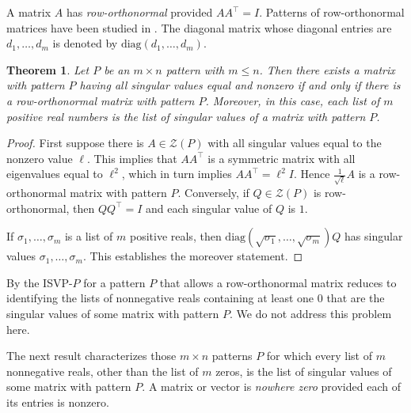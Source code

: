 \documentclass[preprint,12pt]{elsarticle}
\newcommand{\trans  }{^\top}
\newtheorem{theorem}{Theorem}[section]
\begin{document}
A matrix $A$ has {\it row-orthonormal} provided 
$AA\trans=I$. 
Patterns of row-orthonormal matrices have been studied in \cite{CHRSS2002, CS2020, F1964, JWP98, W96}.  The diagonal 
matrix whose diagonal entries are $d_1, \ldots, d_m$ is denoted by $\mbox{diag}(d_1, \ldots, d_m)$.

\begin{theorem}
\label{ortho}
Let $P$ be an $m\times n$ pattern with $m\leq n$.
Then there exists a matrix with pattern $P$ having 
all singular values equal and nonzero if and only if 
there is a row-orthonormal matrix with pattern $P$.
Moreover, in this case,   each list of $m$ positive real numbers is 
the list of singular values of a matrix with pattern $P$.
\end{theorem}

\begin{proof}
First suppose there is $A\in \mathcal{Z}(P)$ 
with all singular values equal to the nonzero value $\ell$.
This implies that  $AA\trans $ is a symmetric matrix with all eigenvalues equal to $\ell^2$, which in turn implies $AA\trans = \ell^2 I$. Hence $\frac{1}{\sqrt{\ell}} A$ is a row-orthonormal matrix with pattern $P$. 
Conversely, if $Q \in \mathcal{Z}(P)$ is row-orthonormal,
then $QQ\trans =I$ and each singular value of $Q$ is $1$.

If $\sigma_1, \ldots, \sigma_m$ is a list of $m$ positive 
reals, then $\mbox{diag}(\sqrt{\sigma_1}, \ldots, \sqrt{\sigma_m})Q$ has singular values $\sigma_1, \ldots, \sigma_m$. This establishes the moreover statement. 
\end{proof}

By  the ISVP-$P$ for a pattern $P$ 
that allows a row-orthonormal matrix reduces to identifying the lists of nonnegative reals containing at least one 0 that are the singular values of some matrix with pattern $P$.  We do not address this problem here.

The next result characterizes those $m\times n$ patterns $P$ for which
every list of $m$ nonnegative reals, other than the list of $m$ zeros, is the list of singular values of some matrix with pattern $P$. A matrix or vector is \textit{nowhere zero} provided each of its entries is nonzero. 
\end{document}

